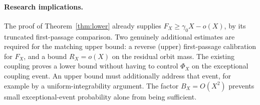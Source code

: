 \paragraph{Research implications.}
The proof of Theorem~\ref{thm:lower} already supplies
$F_X\ge\gamma_0X-o(X)$, by its truncated first-passage comparison.
Two genuinely additional estimates are required for the matching
upper bound: a reverse (upper) first-passage calibration for $F_X$,
and a bound $R_X=o(X)$ on the residual orbit mass.
The existing coupling proves a lower bound without having to
control $\Phi_X$ on the exceptional coupling event. An upper
bound must additionally address that event, for example by a
uniform-integrability argument. The factor $B_X=O(X^2)$ prevents
small exceptional-event probability alone from being sufficient.
